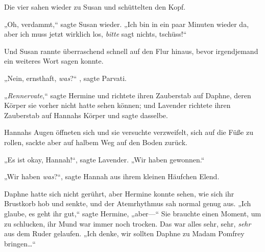 Die vier sahen wieder zu Susan und schüttelten den Kopf.

„Oh, verdammt,“ sagte Susan wieder. „Ich bin in ein paar Minuten wieder da, aber ich muss jetzt wirklich los, \emph{bitte} sagt nichts, tschüss!“

Und Susan rannte überraschend schnell auf den Flur hinaus, bevor irgendjemand ein weiteres Wort sagen konnte.

„Nein, ernsthaft, \emph{was}?“ , sagte Parvati.

„\emph{Rennervate},“ sagte Hermine und richtete ihren Zauberstab auf Daphne, deren Körper sie vorher nicht hatte sehen können; und Lavender richtete ihren Zauberstab auf Hannahs Körper und sagte dasselbe.

Hannahs Augen öffneten sich und sie versuchte verzweifelt, sich auf die Füße zu rollen, sackte aber auf halbem Weg auf den Boden zurück.

„Es ist okay, Hannah!“, sagte Lavender. „Wir haben gewonnen.“

„Wir haben \emph{was}?“, sagte Hannah aus ihrem kleinen Häufchen Elend.

Daphne hatte sich nicht gerührt, aber Hermine konnte sehen, wie sich ihr Brustkorb hob und senkte, und der Atemrhythmus sah normal genug aus. „Ich glaube, es geht ihr gut,“ sagte Hermine, „aber—“ Sie brauchte einen Moment, um zu schlucken, ihr Mund war immer noch trocken. Das war alles sehr, sehr, \emph{sehr} aus dem Ruder gelaufen. „Ich denke, wir sollten Daphne zu Madam Pomfrey bringen…“


